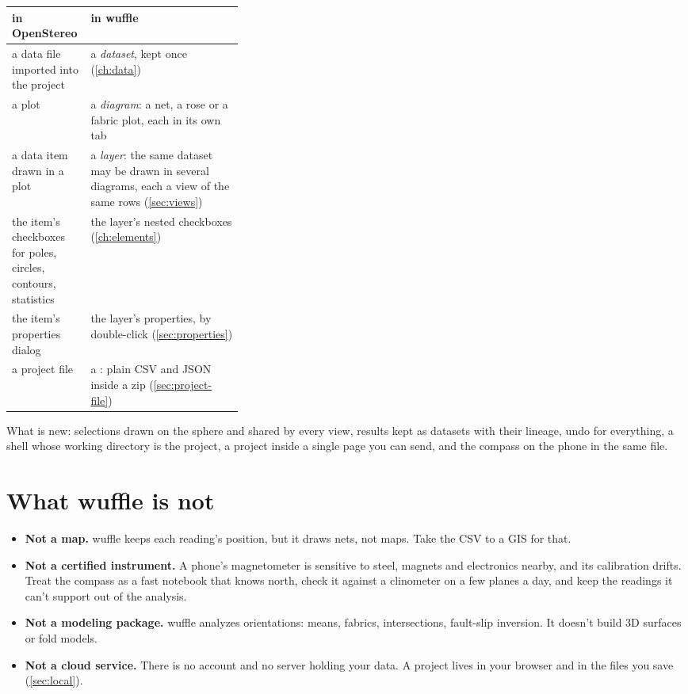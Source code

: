 \begin{center}\small
\begin{tabularx}{\linewidth}{@{}>{\raggedright}p{0.34\linewidth}L@{}}\toprule
\sffamily\bfseries in OpenStereo & \sffamily\bfseries in wuffle \\\midrule
a data file imported into the project & a \emph{dataset}, kept once (\cref{ch:data}) \\
a plot & a \emph{diagram}: a net, a rose or a fabric plot, each in its own tab \\
a data item drawn in a plot & a \emph{layer}: the same dataset may be drawn in several diagrams, each a view of the same rows (\cref{sec:views}) \\
the item's checkboxes for poles, circles, contours, statistics & the layer's nested checkboxes (\cref{ch:elements}) \\
the item's properties dialog & the layer's properties, by double-click (\cref{sec:properties}) \\
a project file & a : plain CSV and JSON inside a zip (\cref{sec:project-file}) \\
\bottomrule\end{tabularx}
\end{center}

What is new: selections drawn on the sphere and shared by every view, results kept as datasets with their
lineage, undo for everything, a shell whose working directory is the project, a project inside a single
page you can send, and the compass on the phone in the same file.

\section{What wuffle is not}\label{sec:not}

\begin{itemize}
\item \textbf{Not a map.} wuffle keeps each reading's position, but it draws nets, not maps. Take the
CSV to a GIS for that.
\item \textbf{Not a certified instrument.} A phone's magnetometer is sensitive to steel, magnets and
electronics nearby, and its calibration drifts. Treat the compass as a fast notebook that knows north,
check it against a clinometer on a few planes a day, and keep the readings it can't support out of the
analysis.
\item \textbf{Not a modeling package.} wuffle analyzes orientations: means, fabrics, intersections,
fault-slip inversion. It doesn't build 3D surfaces or fold models.
\item \textbf{Not a cloud service.} There is no account and no server holding your data. A project lives in
your browser and in the files you save (\cref{sec:local}).
\end{itemize}

